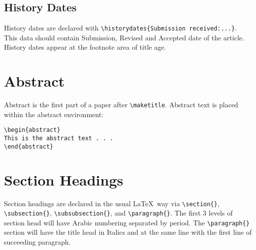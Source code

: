 \documentclass{clv3}
\begin{document}
\subsection{History Dates}

History dates are declared with \verb|\historydates{Submission received:...}|. This data
should contain Submission, Revised and Accepted date of the article. History dates appear
at the footnote area of title age.


\section{Abstract}

Abstract is the first part of a paper after \verb|\maketitle|. Abstract text is 
placed within the abstract environment:

\begin{verbatim}
\begin{abstract}
This is the abstract text . . .
\end{abstract}
\end{verbatim}

\section{Section Headings}

Section headings are declared in the usual \LaTeX\ way via \verb|\section{}|, 
\verb|\subsection{}|, \verb|\subsubsection{}|, and \verb|\paragraph{}|. The 
first 3 levels of section head will have Arabic numbering separated 
by period. The \verb|\paragraph{}| section will have the title head in Italics 
and at the same line with the first line of succeeding paragraph.
\end{document}

